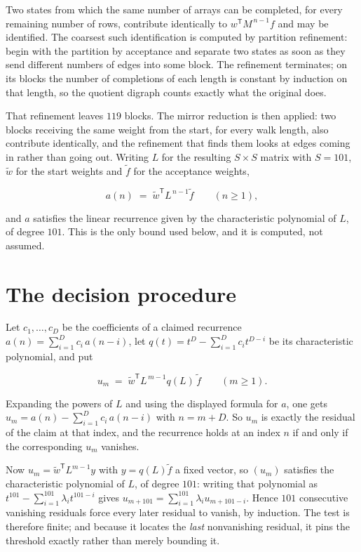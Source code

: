 \documentclass[11pt]{article}
\theoremstyle{definition}
\begin{document}
Two states from which the same number of arrays can be completed, for every remaining number of rows, contribute identically to $w^{\mathsf T}M^{\,n-1}f$ and may be identified. The coarsest such identification is computed by partition refinement: begin with the partition by acceptance and separate two states as soon as they send different numbers of edges into some block. The refinement terminates; on its blocks the number of completions of each length is constant by induction on that length, so the quotient digraph counts exactly what the original does.

That refinement leaves $119$ blocks. The mirror reduction is then applied: two blocks receiving the same weight from the start, for every walk length, also contribute identically, and the refinement that finds them looks at edges coming in rather than going out. Writing $L$ for the resulting $S \times S$ matrix with $S = 101$, $\tilde w$ for the start weights and $\tilde f$ for the acceptance weights,

\[a(n) \;=\; \tilde w^{\mathsf T} L^{\,n-1} \tilde f \qquad (n \ge 1),\]

and $a$ satisfies the linear recurrence given by the characteristic polynomial of $L$, of degree $101$. This is the only bound used below, and it is computed, not assumed.

\section{The decision procedure}

Let $c_1,\dots,c_D$ be the coefficients of a claimed recurrence $a(n) = \sum_{i=1}^{D} c_i\,a(n-i)$, let $q(t) = t^{D} - \sum_{i=1}^{D} c_i t^{D-i}$ be its characteristic polynomial, and put

\[u_m \;=\; \tilde w^{\mathsf T} L^{\,m-1} q(L)\,\tilde f \qquad (m \ge 1).\]

Expanding the powers of $L$ and using the displayed formula for $a$, one gets $u_m = a(n) - \sum_{i=1}^{D} c_i\,a(n-i)$ with $n = m + D$. So $u_m$ is exactly the residual of the claim at that index, and the recurrence holds at an index $n$ if and only if the corresponding $u_m$ vanishes.

Now $u_m = \tilde w^{\mathsf T} L^{m-1} y$ with $y = q(L)\tilde f$ a fixed vector, so $(u_m)$ satisfies the characteristic polynomial of $L$, of degree $101$: writing that polynomial as $t^{101} - \sum_{i=1}^{101} \lambda_i t^{101-i}$ gives $u_{m+101} = \sum_{i=1}^{101} \lambda_i u_{m+101-i}$. Hence $101$ consecutive vanishing residuals force every later residual to vanish, by induction. The test is therefore finite; and because it locates the {\itshape last} nonvanishing residual, it pins the threshold exactly rather than merely bounding it.
\end{document}
